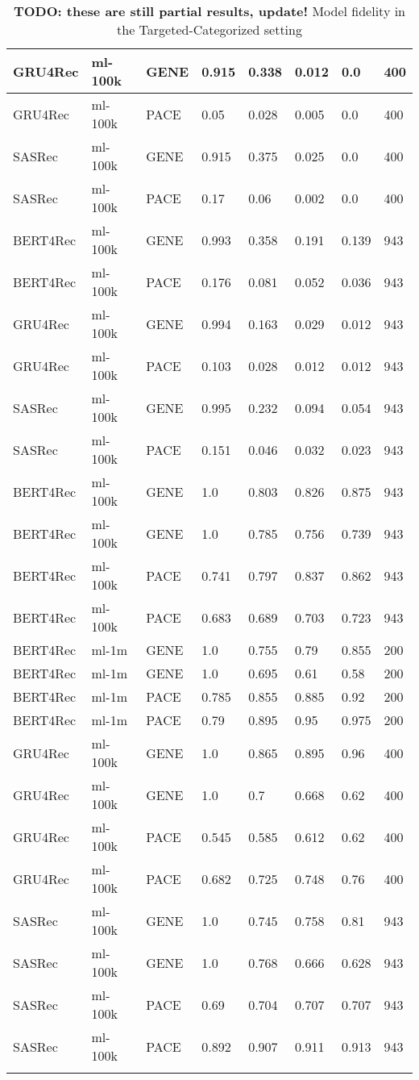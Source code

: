 \begin{longtable}{|l|l|l|l|l|l|l|l|}
GRU4Rec & ml-100k & GENE & 0.915 & 0.338 & 0.012 & 0.0 & 400 \\ \hline
GRU4Rec & ml-100k & PACE & 0.05 & 0.028 & 0.005 & 0.0 & 400 \\ \hline
SASRec & ml-100k & GENE & 0.915 & 0.375 & 0.025 & 0.0 & 400 \\ \hline
SASRec & ml-100k & PACE & 0.17 & 0.06 & 0.002 & 0.0 & 400 \\ \hline
BERT4Rec & ml-100k & GENE & 0.993 & 0.358 & 0.191 & 0.139 & 943 \\ \hline
BERT4Rec & ml-100k & PACE & 0.176 & 0.081 & 0.052 & 0.036 & 943 \\ \hline
GRU4Rec & ml-100k & GENE & 0.994 & 0.163 & 0.029 & 0.012 & 943 \\ \hline
GRU4Rec & ml-100k & PACE & 0.103 & 0.028 & 0.012 & 0.012 & 943 \\ \hline
SASRec & ml-100k & GENE & 0.995 & 0.232 & 0.094 & 0.054 & 943 \\ \hline
SASRec & ml-100k & PACE & 0.151 & 0.046 & 0.032 & 0.023 & 943 \\ \hline
BERT4Rec & ml-100k & GENE & 1.0 & 0.803 & 0.826 & 0.875 & 943 \\ \hline
BERT4Rec & ml-100k & GENE & 1.0 & 0.785 & 0.756 & 0.739 & 943 \\ \hline
BERT4Rec & ml-100k & PACE & 0.741 & 0.797 & 0.837 & 0.862 & 943 \\ \hline
BERT4Rec & ml-100k & PACE & 0.683 & 0.689 & 0.703 & 0.723 & 943 \\ \hline
BERT4Rec & ml-1m & GENE & 1.0 & 0.755 & 0.79 & 0.855 & 200 \\ \hline
BERT4Rec & ml-1m & GENE & 1.0 & 0.695 & 0.61 & 0.58 & 200 \\ \hline
BERT4Rec & ml-1m & PACE & 0.785 & 0.855 & 0.885 & 0.92 & 200 \\ \hline
BERT4Rec & ml-1m & PACE & 0.79 & 0.895 & 0.95 & 0.975 & 200 \\ \hline
GRU4Rec & ml-100k & GENE & 1.0 & 0.865 & 0.895 & 0.96 & 400 \\ \hline
GRU4Rec & ml-100k & GENE & 1.0 & 0.7 & 0.668 & 0.62 & 400 \\ \hline
GRU4Rec & ml-100k & PACE & 0.545 & 0.585 & 0.612 & 0.62 & 400 \\ \hline
GRU4Rec & ml-100k & PACE & 0.682 & 0.725 & 0.748 & 0.76 & 400 \\ \hline
SASRec & ml-100k & GENE & 1.0 & 0.745 & 0.758 & 0.81 & 943 \\ \hline
SASRec & ml-100k & GENE & 1.0 & 0.768 & 0.666 & 0.628 & 943 \\ \hline
SASRec & ml-100k & PACE & 0.69 & 0.704 & 0.707 & 0.707 & 943 \\ \hline
SASRec & ml-100k & PACE & 0.892 & 0.907 & 0.911 & 0.913 & 943 \\ \hline
\caption{\textbf{TODO: these are still partial results, update!} Model fidelity in the Targeted-Categorized setting}
    \label{tab:eval_targ_cat}
    \end{longtable}
    \endgroup